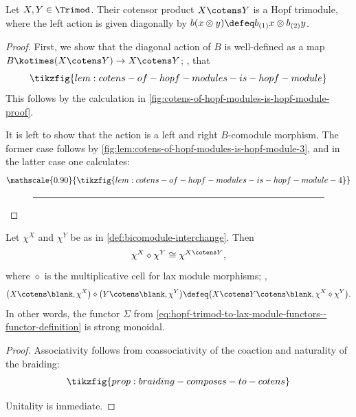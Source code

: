 \begin{lemma}\label{lem:cotens-of-hopf-modules-is-hopf-module}
  Let \(X,Y \in \Trimod\).
  Their cotensor product \(X \cotens Y\) is a Hopf trimodule,
  where the left action is given diagonally by \(b(x \otimes y) \defeq b_{(1)}x \otimes b_{(2)}y\).
\end{lemma}
\begin{proof}
  First, we show that the diagonal action of \(B\) is well-defined as a map \(B \kotimes (X \cotens Y) \to X \cotens Y\);
  \ie, that
  \[
    \tikzfig{lem:cotens-of-hopf-modules-is-hopf-module}
  \]
  This follows by the calculation in \cref{fig:cotens-of-hopf-modules-is-hopf-module-proof}.

  It is left to show that the action is a left and right \(B\)\hyp{}comodule morphism.
  The former case follows by \cref{fig:lem:cotens-of-hopf-modules-is-hopf-module-3},
  and in the latter case one calculates:
  \[
    \mathscale{0.90}{\tikzfig{lem:cotens-of-hopf-modules-is-hopf-module-4}}
  \]
  \begin{figure}[htbp]
    \centering
    \vspace{-\onelineskip}%
  \end{figure}
  \begin{figure}[htbp]
    \centering
    \hrule\vspace{\onelineskip}%
    \vspace{-\onelineskip}%
  \end{figure}
\end{proof}

\begin{proposition}\label{prop:braiding-composes-to-cotens}
  Let \(\chi^X\) and \(\chi^{Y}\) be as in \cref{def:bicomodule-interchange}.
  Then
  \[
    \chi^X \diamond \chi^Y \cong \chi^{X \cotens Y},
  \]
  where \(\diamond\) is the multiplicative cell for lax module morphisms;
  \ie,
  \[
    \big(X \cotens \blank, \chi^X\big) \diamond \big(Y \cotens \blank, \chi^Y\big) \defeq \big(X \cotens Y \cotens \blank, \chi^X \diamond \chi^Y\big).
  \]
  In other words, the functor \(\Sigma\)
  from \cref{eq:hopf-trimod-to-lax-module-functors--functor-definition}
  is strong monoidal.
\end{proposition}
\begin{proof}
  Associativity follows from coassociativity of the coaction and naturality of the braiding:
  \[
    \tikzfig{prop:braiding-composes-to-cotens}
  \]

  Unitality is immediate.
\end{proof}

